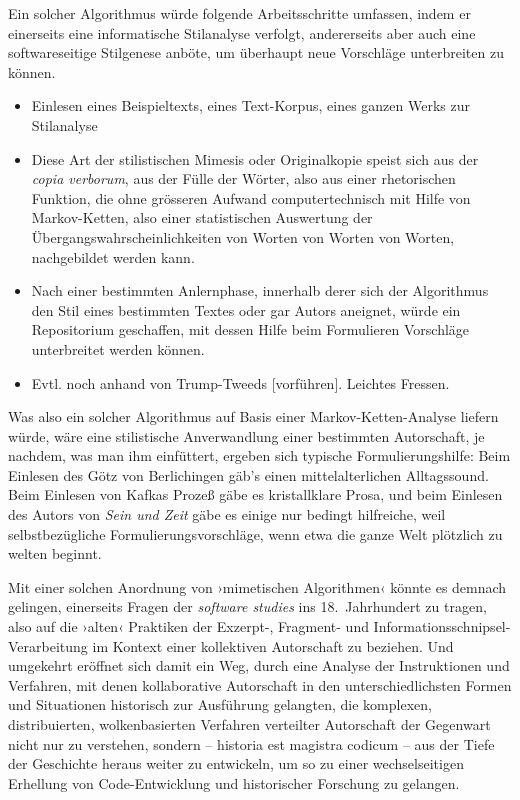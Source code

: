 \documentclass[a4paper,11pt]{article}
\newcommand{\inanf}[1]{›#1‹}
\newcommand{\ueber}[1]{{\color{crimson}[#1]}}
\begin{document}
Ein solcher Algorithmus würde folgende Arbeitsschritte umfassen, indem er einerseits eine informatische Stilanalyse verfolgt, andererseits aber auch eine softwareseitige Stilgenese anböte, um überhaupt neue Vorschläge unterbreiten zu können.

\begin{itemize}
\item Einlesen eines Beispieltexts, eines Text-Korpus, eines ganzen Werks zur Stilanalyse
\item Diese Art der stilistischen Mimesis oder Originalkopie speist sich aus der \emph{copia verborum}, aus der Fülle der Wörter, also aus einer rhetorischen Funktion, die ohne grösseren Aufwand computertechnisch mit Hilfe von Markov-Ketten, also einer statistischen Auswertung der Übergangswahrscheinlichkeiten von Worten von Worten von Worten, nachgebildet werden kann. 
%
\item Nach einer bestimmten Anlernphase, innerhalb derer sich der Algorithmus den Stil eines bestimmten Textes oder gar Autors aneignet, würde ein Repositorium geschaffen, mit dessen Hilfe beim Formulieren Vorschläge unterbreitet werden können. %
\item Evtl. noch anhand von Trump-Tweeds \ueber{vorführen}. Leichtes Fressen.
\end{itemize}
Was also ein solcher Algorithmus auf Basis einer Markov-Ketten-Analyse liefern würde, wäre eine stilistische Anverwandlung einer bestimmten Autorschaft, je nachdem, was man ihm einfüttert, ergeben sich typische Formulierungshilfe: Beim Einlesen des Götz von Berlichingen gäb's einen mittelalterlichen Alltagssound. Beim Einlesen von Kafkas Prozeß gäbe es kristallklare Prosa, und beim Einlesen des Autors von \emph{Sein und Zeit} gäbe es einige nur bedingt hilfreiche, weil selbstbezügliche Formulierungsvorschläge, wenn etwa die ganze Welt plötzlich zu welten beginnt.

Mit einer solchen Anordnung von \inanf{mimetischen Algorithmen} könnte es demnach gelingen, einerseits Fragen der \emph{software studies} ins 18.~Jahrhundert zu tragen, also auf die \inanf{alten} Praktiken der Exzerpt-, Fragment- und Informationsschnipsel-Verarbeitung im Kontext einer kollektiven Autorschaft zu beziehen. Und umgekehrt eröffnet sich damit ein Weg, durch eine Analyse der Instruktionen und Verfahren, mit denen kollaborative Autorschaft in den unterschiedlichsten Formen und Situationen historisch zur Ausführung gelangten, die komplexen, distribuierten, wolkenbasierten Verfahren verteilter Autorschaft der Gegenwart nicht nur zu verstehen, sondern – historia est magistra codicum – aus der Tiefe der Geschichte heraus weiter zu entwickeln, um so zu einer wechselseitigen Erhellung von Code-Entwicklung und historischer Forschung zu gelangen.
\end{document}
